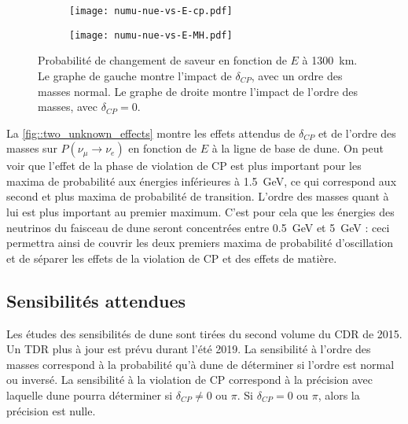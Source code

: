        \begin{figure}[htpb]
          \begin{subfigure}[t]{0.49\textwidth}
            \texttt{[image: numu-nue-vs-E-cp.pdf]}
          \end{subfigure}\hfill
          \begin{subfigure}[t]{0.49\textwidth}
            \texttt{[image: numu-nue-vs-E-MH.pdf]}
          \end{subfigure}
            \caption[Probabilité de changement de saveur en fonction de $E$ à \SI{1300}{\kilo\meter}]{\label{fig::two_unknown_effects}Probabilité de changement de saveur en fonction de $E$ à \SI{1300}{\kilo\meter}. Le graphe de gauche montre l'impact de $\delta_{CP}$, avec un ordre des masses normal. Le graphe de droite montre l'impact de l'ordre des masses, avec $\delta_{CP}=0$.}
        \end{figure}
        La \autoref{fig::two_unknown_effects} montre les effets attendus de $\delta_{CP}$ et de l'ordre des masses sur $P(\nu_{\mu}\to\nu_e)$ en fonction de $E$ à la ligne de base de \gls{dune}. On peut voir que l'effet de la phase de violation de CP est plus important pour les maxima de probabilité aux énergies inférieures à \SI{1.5}{\giga\electronvolt}, ce qui correspond aux second et plus maxima de probabilité de transition. L'ordre des masses quant à lui est plus important au premier maximum. C'est pour cela que les énergies des neutrinos du faisceau de \gls{dune} seront concentrées entre  \SI{0.5}{\giga\electronvolt} et \SI{5}{\giga\electronvolt} : ceci permettra ainsi de couvrir les deux premiers maxima de probabilité d'oscillation et de séparer les effets de la violation de CP et des effets de matière.


    \subsection{Sensibilités attendues}\label{sec::sensibility}

        Les études des sensibilités de \gls{dune} sont tirées du second volume du CDR de 2015\cite{Collaboration2015}. Un TDR plus à jour est prévu durant l'été 2019. La sensibilité à l'ordre des masses correspond à la probabilité qu'à \gls{dune} de déterminer si l'ordre est normal ou inversé. La sensibilité à la violation de CP correspond à la précision avec laquelle \gls{dune} pourra déterminer si $\delta_{CP} \neq 0$ ou $\pi$. Si $\delta_{CP} = 0$ ou $\pi$, alors la précision est nulle. %

